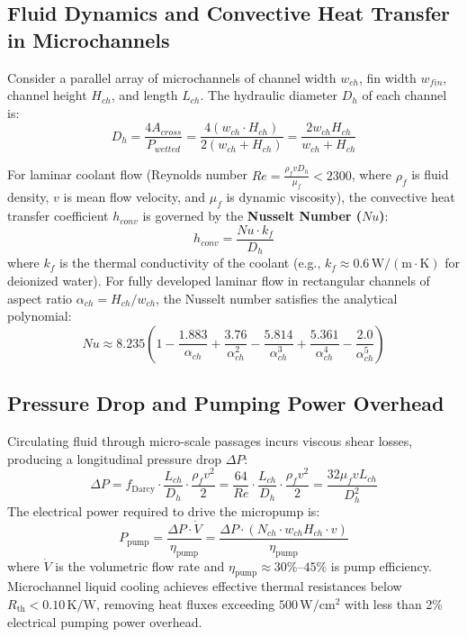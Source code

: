 \subsection{Fluid Dynamics and Convective Heat Transfer in Microchannels}
Consider a parallel array of microchannels of channel width $w_{ch}$, fin width $w_{fin}$, channel height $H_{ch}$, and length $L_{ch}$. The hydraulic diameter $D_h$ of each channel is:
\begin{equation}
D_h = \frac{4 A_{cross}}{P_{wetted}} = \frac{4 (w_{ch} \cdot H_{ch})}{2 (w_{ch} + H_{ch})} = \frac{2 w_{ch} H_{ch}}{w_{ch} + H_{ch}}
\label{eq:ch7_dh}
\end{equation}

For laminar coolant flow (Reynolds number $Re = \frac{\rho_f v D_h}{\mu_f} < 2300$, where $\rho_f$ is fluid density, $v$ is mean flow velocity, and $\mu_f$ is dynamic viscosity), the convective heat transfer coefficient $h_{conv}$ is governed by the \textbf{Nusselt Number ($Nu$)}:
\begin{equation}
h_{conv} = \frac{Nu \cdot k_f}{D_h}
\label{eq:ch7_hconv}
\end{equation}
where $k_f$ is the thermal conductivity of the coolant (e.g., $k_f \approx 0.6\,\mathrm{W/(m\cdot K)}$ for deionized water). For fully developed laminar flow in rectangular channels of aspect ratio $\alpha_{ch} = H_{ch} / w_{ch}$, the Nusselt number satisfies the analytical polynomial:
\begin{equation}
Nu \approx 8.235 \left( 1 - \frac{1.883}{\alpha_{ch}} + \frac{3.76}{\alpha_{ch}^2} - \frac{5.814}{\alpha_{ch}^3} + \frac{5.361}{\alpha_{ch}^4} - \frac{2.0}{\alpha_{ch}^5} \right)
\label{eq:ch7_nusselt}
\end{equation}

\subsection{Pressure Drop and Pumping Power Overhead}
Circulating fluid through micro-scale passages incurs viscous shear losses, producing a longitudinal pressure drop $\Delta P$:
\begin{equation}
\Delta P = f_{\mathrm{Darcy}} \cdot \frac{L_{ch}}{D_h} \cdot \frac{\rho_f v^2}{2} = \frac{64}{Re} \cdot \frac{L_{ch}}{D_h} \cdot \frac{\rho_f v^2}{2} = \frac{32 \mu_f v L_{ch}}{D_h^2}
\label{eq:ch7_pressure_drop}
\end{equation}
The electrical power required to drive the micropump is:
\begin{equation}
P_{\mathrm{pump}} = \frac{\Delta P \cdot \dot{V}}{\eta_{\mathrm{pump}}} = \frac{\Delta P \cdot (N_{ch} \cdot w_{ch} H_{ch} \cdot v)}{\eta_{\mathrm{pump}}}
\label{eq:ch7_pump_power}
\end{equation}
where $\dot{V}$ is the volumetric flow rate and $\eta_{\mathrm{pump}} \approx 30\%\text{--}45\%$ is pump efficiency. Microchannel liquid cooling achieves effective thermal resistances below $R_{\mathrm{th}} < 0.10\,\mathrm{K/W}$, removing heat fluxes exceeding \textbf{$500\,\mathrm{W/cm^2}$} with less than 2\% electrical pumping power overhead.

